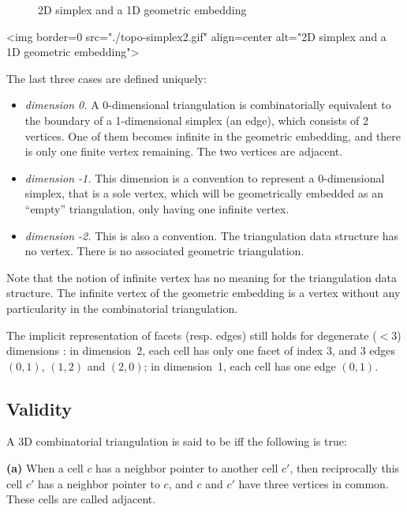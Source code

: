 \begin{itemize}
\begin{ccTexOnly}
\begin{figure}
\begin{center}
\end{center}
\caption{2D simplex and a 1D geometric embedding \label{TDS3-fig-topo-simplex2}}
\end{figure} 
\end{ccTexOnly}
\begin{ccHtmlOnly}
<img border=0 src="./topo-simplex2.gif" align=center
alt="2D simplex and a 1D geometric embedding">
\end{ccHtmlOnly}
\end{itemize}

The last three cases are defined uniquely:
\begin{itemize}
\item \emph{dimension 0.} A 0-dimensional triangulation is
combinatorially equivalent to the boundary of a 1-dimensional simplex
(an edge), which consists of 2 vertices. One of them becomes infinite
in the geometric embedding, and there is only one finite vertex
remaining. The two vertices are adjacent.
\item \emph{dimension -1.} This dimension is a convention to represent a 
0-dimensional simplex, that is a sole vertex, which will be
geometrically embedded as an ``empty'' triangulation, only having one
infinite vertex.
\item \emph{dimension -2.} This is also a convention. The
triangulation data structure has no vertex. There is no associated
geometric triangulation.
\end{itemize} 

Note that the notion of infinite vertex has no meaning for the
triangulation data structure. The infinite vertex of the geometric
embedding is a vertex without any particularity in the
combinatorial triangulation.

The implicit representation of facets (resp. edges) still holds
for degenerate ($< 3$) dimensions : in dimension~2, each cell has only one
facet of index 3, and 3 edges $(0,1)$, $(1,2)$ and $(2,0)$; in
dimension~1, each cell has one edge $(0,1)$. 

\subsection{Validity}
\label{TDS3-sec-Valid}
A 3D combinatorial triangulation is said to be  
iff the following is true:

{\bf (a)} When a cell $c$ has a neighbor pointer to another cell $c'$,
then reciprocally this cell $c'$ has a neighbor pointer to $c$, and
$c$ and $c'$ have three vertices in common. These cells are called
adjacent. 

